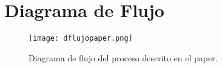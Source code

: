 \documentclass[11pt,a4paper]{article}
\begin{document}
\section{Diagrama de Flujo}
\begin{figure}[H]
    \centering
    \texttt{[image: dflujopaper.png]} %
    \caption{Diagrama de flujo del proceso descrito en el paper.}
    \label{fig:diagrama_flujo}
\end{figure}
\end{document}
